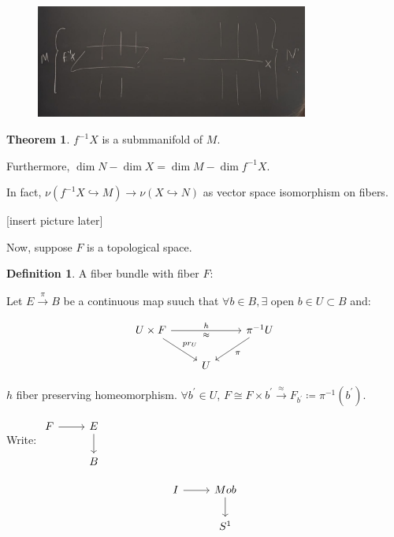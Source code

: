 \documentclass{article}
\theoremstyle{definition}
\newtheorem*{definition}{Definition}
\newtheorem{theorem}{Theorem}
\begin{document}
    \begin{figure}[H]
        \centering
        \includegraphics[width=0.8\textwidth]{img/transverse}
        \caption{}
        \label{fig:}
    \end{figure}

    \begin{theorem}
        \(f ^{-1} X\) is a submmanifold of \(M\).

        Furthermore, \(\dim N - \dim X = \dim M - \dim f ^{-1} X\).
    \end{theorem}

    In fact, \(\nu (f ^{-1} X \hookrightarrow M) \to \nu (X \hookrightarrow N)\) as vector space isomorphism on fibers.

    [insert picture later]

    Now, suppose \(F\) is a topological space.

    \begin{definition}
        A fiber bundle with fiber \(F\):

        Let \(E \xrightarrow{\pi} B\) be a continuous map suuch that \(\forall b\in B, \exists\) open \(b\in U \subset B\) and:

        \[
            \begin{tikzcd}
                U \times F \ar[rr, "h", "\approx"'] \ar[rd, "pr_U"] && \pi ^{-1} U \ar[ld,"\pi"] \\ & U 
            \end{tikzcd}
        \]

        \(h\) fiber preserving homeomorphism. \(\forall b^{\prime} \in U\), \(F \cong F \times b^{\prime} \xrightarrow{\approx} F_{b^{\prime}} \coloneqq \pi ^{-1} (b^{\prime})\).
    \end{definition}

    Write: \( \begin{tikzcd}
        F \ar[r] & E \ar[d] \\ & B 
        \end{tikzcd} \)

    \[
        \begin{tikzcd}
            I \ar[r] & Mob \ar[d] \\ & S^1
        \end{tikzcd}
    \]
\end{document}
